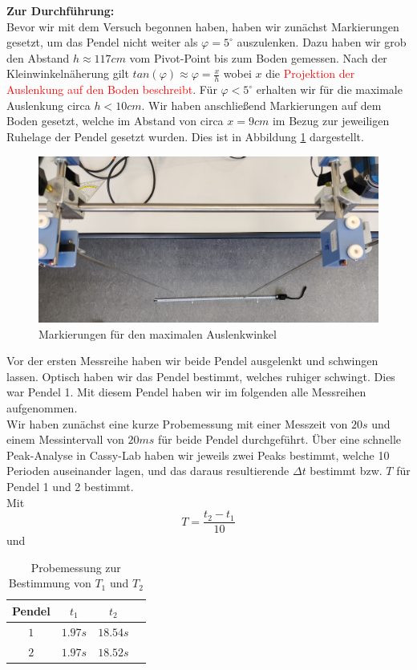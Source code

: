 \textbf{Zur Durchführung:}\\
Bevor wir mit dem Versuch begonnen haben, haben wir zunächst Markierungen gesetzt, um das Pendel nicht weiter als $\varphi=5 ^\circ$ auszulenken. Dazu haben wir grob den Abstand $h \approx 117cm$ vom Pivot-Point bis zum Boden gemessen. Nach der Kleinwinkelnäherung gilt $tan(\varphi) \approx \varphi = \frac{x}{h}$ wobei $x$ die \textcolor{red}{Projektion der Auslenkung auf den Boden beschreibt}. Für $\varphi < 5^\circ$ erhalten wir für die maximale Auslenkung circa $h<10cm$. Wir haben anschließend Markierungen auf dem Boden gesetzt, welche im Abstand von circa $x=9cm$ im Bezug zur jeweiligen Ruhelage der Pendel gesetzt wurden. Dies ist in Abbildung \ref{fig:Markierung_max_Auslenkwinkel} dargestellt. 
\begin{figure}[H]
	\centering
	\includegraphics[width=1\textwidth]{Markierung_max_Auslenkwinkel.jpg}
	\caption{Markierungen für den maximalen Auslenkwinkel}
	\label{fig:Markierung_max_Auslenkwinkel}
\end{figure}
Vor der ersten Messreihe haben wir beide Pendel ausgelenkt und schwingen lassen. Optisch haben wir das Pendel bestimmt, welches ruhiger schwingt. Dies war Pendel 1. Mit diesem Pendel haben wir im folgenden alle Messreihen aufgenommen.\\
Wir haben zunächst eine kurze Probemessung mit einer Messzeit von $20s$ und einem Messintervall von $20ms$  für beide Pendel durchgeführt. Über eine schnelle Peak-Analyse in Cassy-Lab haben wir jeweils zwei Peaks bestimmt, welche 10 Perioden auseinander lagen, und das daraus resultierende $\Delta t$ bestimmt bzw. $T$ für Pendel 1 und 2 bestimmt.\\
Mit 
\[T=\frac{t_2-t_1}{10}
\]
und 
\begin{table}[hb]
	\centering
	\caption{Probemessung zur Bestimmung von $T_1$ und $T_2$}
	\label{tab:messwerte_oszi}
	\begin{tabular}{|c|c|c|c|}
		\hline
		Pendel & $t_1$ & $t_2$ \\
		\hline
		$1$ & $1.97s$ & $18.54s$\\
		\hline
		$2$ & $1.97s$ & $18.52s$\\
		\hline
	\end{tabular}
\end{table}\\

